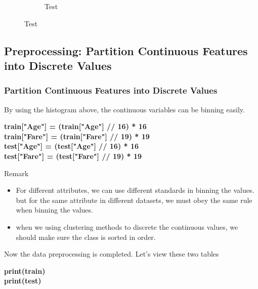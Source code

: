 \documentclass{beamer}
\begin{document}
\begin{frame}
\begin{center}
\begin{figure}
\begin{subfigure}[p]{0.48\textwidth}
	        \caption{Test}
	    \end{subfigure}
	  \end{figure}
	\end{center}
\end{frame}

\subsection{Preprocessing: Partition Continuous Features into Discrete Values}
\begin{frame}
	\frametitle{Partition Continuous Features into Discrete Values}
	\begin{flushleft}
		By using the histogram above, the continuous variables can be binning easily.
	\end{flushleft}
	\begin{center}
		\textbf{\color{blue} \footnotesize
			train["Age"] = (train["Age"] // 16) * 16~~ \\
			train["Fare"] = (train["Fare"] // 19) * 19 \\
			test["Age"] = (test["Age"] // 16) * 16~~~~ \\
			test["Fare"] = (test["Fare"] // 19) * 19~~
		}
	\end{center}
	\begin{block}{Remark}
		\begin{itemize}
	  	\item For different attributes, we can use different standards in binning the values. but for the same attribute in different datasets, we must obey the same rule when binning the values. 
	  	\item when we using clustering methods to discrete the continuous values, we should make sure the class is sorted in order.
		\end{itemize}
	\end{block}
	\begin{flushleft}
		Now the data preprocessing is completed. Let's view these two tables
	\end{flushleft}
	\begin{center}
		\textbf{\color{blue} \footnotesize
			print(train) \\
			print(test)~
		}
	\end{center}
\end{frame}
\end{document}
